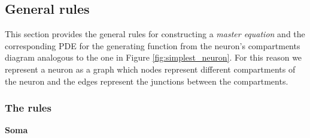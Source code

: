 \documentclass[a4paper, 11pt]{article}
\begin{document}


\subsection{General rules}
This section provides the general rules for constructing a {\it master equation} and the corresponding PDE for the generating function from the neuron's compartments diagram analogous to the one in Figure \ref{fig:simplest_neuron}. For this reason we represent a neuron as a graph which nodes represent different compartments of the neuron and the edges represent the junctions between the compartments.

\subsubsection{The rules}
              {\bf Soma}
              
\end{document}
